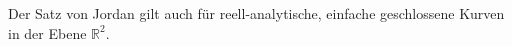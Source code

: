 \begin{satz}
    Der Satz von Jordan gilt auch für reell-analytische, einfache geschlossene Kurven in der Ebene $\mathbb{R}^2$.
\end{satz}